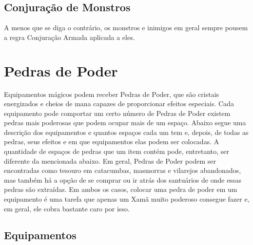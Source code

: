 \begin{multicols}{2}
\subsection*{Conjuração de Monstros}%

A menos que se diga o contrário, os monstros e inimigos em geral sempre pousem a
regra Conjuração Armada aplicada a eles.

\section{Pedras de Poder}%

Equipamentos mágicos podem receber Pedras de Poder, que são cristais energizados
e cheios de mana capazes de proporcionar efeitos especiais. Cada equipamento
pode comportar um certo número de Pedras de Poder existem pedras mais poderosas
que podem ocupar mais de um espaço.
Abaixo segue uma descrição dos equipamentos e quantos espaços cada um tem e,
depois, de todas as pedras, seus efeitos e em que equipamentos elas podem ser
colocadas. A quantidade de espaços de pedras que um item contém pode,
entretanto, ser diferente da mencionada abaixo.
Em geral, Pedras de Poder podem ser encontradas como tesouro em catacumbas,
masmorras e vilarejos abandonados, mas também há a opção de se comprar ou ir
atrás dos santuários de onde essas pedras são extraídas. Em ambos os casos,
colocar uma pedra de poder em um equipamento é uma tarefa que apenas um Xamã
muito poderoso consegue fazer e, em geral, ele cobra bastante caro por isso.

\end{multicols}

\subsection*{Equipamentos}%

